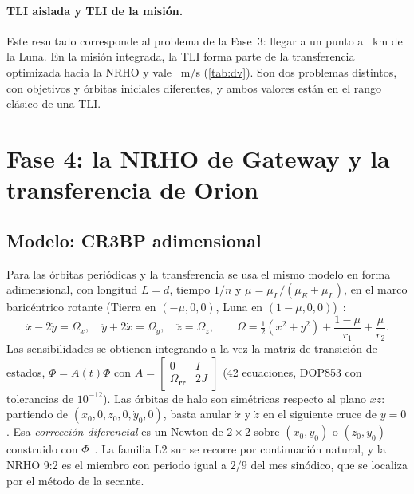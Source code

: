 \documentclass[11pt,a4paper]{article}
\newcommand{\vect}[1]{\mathbf{#1}}
\begin{document}
\paragraph{TLI aislada y TLI de la misión.} Este resultado corresponde al problema de la Fase~3: llegar a un punto a \RTliFlybyAltKm~km de la Luna. En la misión integrada, la TLI forma parte de la transferencia optimizada hacia la NRHO y vale \RMDvTliMs~m/s (\autoref{tab:dv}). Son dos problemas distintos, con objetivos y órbitas iniciales diferentes, y ambos valores están en el rango clásico de una TLI.

\section{Fase 4: la NRHO de Gateway y la transferencia de Orion}\label{sec:f4}
\subsection{Modelo: CR3BP adimensional}
Para las órbitas periódicas y la transferencia se usa el mismo modelo en forma adimensional, con longitud $L=d$, tiempo $1/n$ y $\mu=\mu_L/(\mu_E+\mu_L)$, en el marco baricéntrico rotante (Tierra en $(-\mu,0,0)$, Luna en $(1-\mu,0,0)$)~\cite{szebehely1967}:
\begin{equation}
\ddot x-2\dot y=\Omega_x,\quad \ddot y+2\dot x=\Omega_y,\quad \ddot z=\Omega_z,\qquad
\Omega=\tfrac12(x^2+y^2)+\frac{1-\mu}{r_1}+\frac{\mu}{r_2}.
\label{eq:cr3bp}
\end{equation}
Las sensibilidades se obtienen integrando a la vez la matriz de transición de estados, $\dot\Phi=A(t)\Phi$ con $A=\left[\begin{smallmatrix}0&I\\ \Omega_{\vect r\vect r}&2J\end{smallmatrix}\right]$ (42 ecuaciones, DOP853 con tolerancias de $10^{-12}$). Las órbitas de halo son simétricas respecto al plano $xz$: partiendo de $(x_0,0,z_0,0,\dot y_0,0)$, basta anular $\dot x$ y $\dot z$ en el siguiente cruce de $y=0$. Esa \emph{corrección diferencial} es un Newton de $2\times2$ sobre $(x_0,\dot y_0)$ o $(z_0,\dot y_0)$ construido con $\Phi$~\cite{howell2001}. La familia L2 sur se recorre por continuación natural, y la NRHO 9:2 es el miembro con periodo igual a $2/9$ del mes sinódico, que se localiza por el método de la secante.
\end{document}
